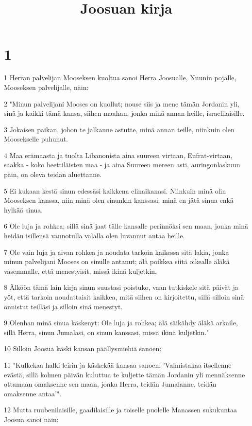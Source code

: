 

\title{Joosuan kirja}


\chapter{1}

\par 1 Herran palvelijan Mooseksen kuoltua sanoi Herra Joosualle, Nuunin pojalle, Mooseksen palvelijalle, näin:
\par 2 "Minun palvelijani Mooses on kuollut; nouse siis ja mene tämän Jordanin yli, sinä ja kaikki tämä kansa, siihen maahan, jonka minä annan heille, israelilaisille.
\par 3 Jokaisen paikan, johon te jalkanne astutte, minä annan teille, niinkuin olen Moosekselle puhunut.
\par 4 Maa erämaasta ja tuolta Libanonista aina suureen virtaan, Eufrat-virtaan, saakka - koko heettiläisten maa - ja aina Suureen mereen asti, auringonlaskuun päin, on oleva teidän aluettanne.
\par 5 Ei kukaan kestä sinun edessäsi kaikkena elinaikanasi. Niinkuin minä olin Mooseksen kanssa, niin minä olen sinunkin kanssasi; minä en jätä sinua enkä hylkää sinua.
\par 6 Ole luja ja rohkea; sillä sinä jaat tälle kansalle perinnöksi sen maan, jonka minä heidän isillensä vannotulla valalla olen luvannut antaa heille.
\par 7 Ole vain luja ja aivan rohkea ja noudata tarkoin kaikessa sitä lakia, jonka minun palvelijani Mooses on sinulle antanut; älä poikkea siitä oikealle äläkä vasemmalle, että menestyisit, missä ikinä kuljetkin.
\par 8 Älköön tämä lain kirja sinun suustasi poistuko, vaan tutkiskele sitä päivät ja yöt, että tarkoin noudattaisit kaikkea, mitä siihen on kirjoitettu, sillä silloin sinä onnistut teilläsi ja silloin sinä menestyt.
\par 9 Olenhan minä sinua käskenyt: Ole luja ja rohkea; älä säikähdy äläkä arkaile, sillä Herra, sinun Jumalasi, on sinun kanssasi, missä ikinä kuljetkin."
\par 10 Silloin Joosua käski kansan päällysmiehiä sanoen:
\par 11 "Kulkekaa halki leirin ja käskekää kansaa sanoen: 'Valmistakaa itsellenne evästä, sillä kolmen päivän kuluttua te kuljette tämän Jordanin yli mennäksenne ottamaan omaksenne sen maan, jonka Herra, teidän Jumalanne, teidän omaksenne antaa'".
\par 12 Mutta ruubenilaisille, gaadilaisille ja toiselle puolelle Manassen sukukuntaa Joosua sanoi näin:
